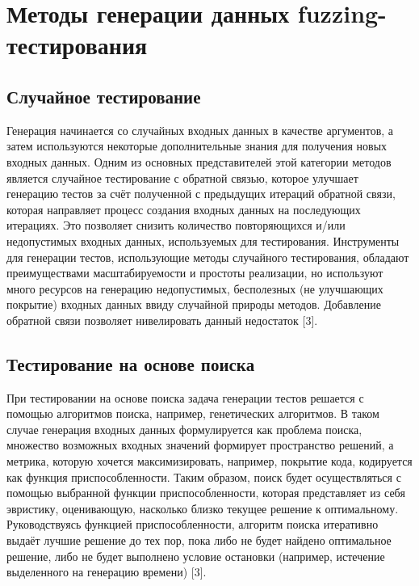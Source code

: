 \section{Методы генерации данных fuzzing-тестирования} \label{ch2:sec-very-short-title} %
\subsection{Случайное тестирование}\label{ch2:random-test}
Генерация начинается со случайных входных
данных в качестве аргументов, а затем используются некоторые дополнительные знания для получения новых входных данных. Одним
из основных представителей этой категории методов является случайное тестирование с обратной связью, которое улучшает генерацию
тестов за счёт полученной с предыдущих итераций обратной связи, которая направляет процесс создания входных данных на последующих
итерациях. Это позволяет снизить количество повторяющихся и/или
недопустимых входных данных, используемых для тестирования.
Инструменты для генерации тестов, использующие методы случайного тестирования, обладают преимуществами масштабируемости и простоты реализации, но используют много ресурсов на генерацию недопустимых, бесполезных (не улучшающих покрытие) входных данных ввиду случайной природы методов. Добавление обратной
связи позволяет нивелировать данный недостаток [3].

\subsection{Тестирование на основе поиска}\label{ch2:search-test}
При тестировании на основе поиска задача генерации тестов решается с
помощью алгоритмов поиска, например, генетических алгоритмов. В таком случае генерация входных данных формулируется как проблема поиска, множество возможных входных значений формирует пространство решений,
а метрика, которую хочется максимизировать, например, покрытие кода, кодируется как функция приспособленности. Таким образом, поиск
будет осуществляться с помощью выбранной функции приспособленности, которая представляет из себя эвристику, оценивающую, насколько
близко текущее решение к оптимальному. Руководствуясь функцией
приспособленности, алгоритм поиска итеративно выдаёт лучшие решение до тех пор, пока либо не будет найдено оптимальное решение, либо
не будет выполнено условие остановки (например, истечение выделенного на генерацию времени) [3].

